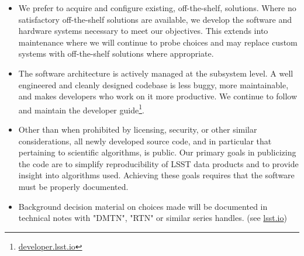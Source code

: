 \begin{itemize}
\item   We prefer to acquire and configure existing, off-the-shelf, solutions. Where no satisfactory off-the-shelf solutions are available, we develop the software and hardware systems necessary to meet our objectives.
This extends into maintenance where we will continue to probe choices and may replace custom systems with off-the-shelf solutions where appropriate.
\item The software architecture is actively managed at the subsystem level. A well engineered and cleanly designed codebase is less buggy, more maintainable, and makes developers who work on it more productive. We continue to follow and maintain the developer guide\footnote{\url{developer.lsst.io}}.
\item  Other than when prohibited by licensing, security, or other similar considerations, all newly developed source code, and in particular that pertaining to scientific algorithms, is public.
Our primary goals in publicizing the code are to simplify reproducibility of LSST data products and to provide insight into algorithms used.
Achieving these goals requires that the software must be properly documented.
\item Background decision material on choices made will be documented in technical notes with "DMTN", "RTN" or similar series handles. (see \url{lsst.io})
\end{itemize}
